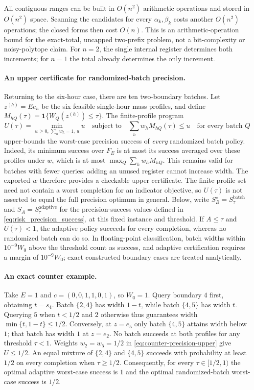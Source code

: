 All contiguous ranges can be built in $O(n^2)$ arithmetic operations
and stored in $O(n^2)$ space. Scanning the candidates for every
$\alpha_k,\beta_k$ costs another $O(n^2)$ operations; the closed forms
then cost $O(n)$. This is an arithmetic-operation bound for the exact-total,
uncapped two-prefix problem, not a bit-complexity or noisy-polytope claim.
For $n=2$, the single internal register determines both increments;
for $n=1$ the total already determines the only increment.


\paragraph{An upper certificate for randomized-batch precision.}
Returning to the six-hour case, there are ten two-boundary batches.
Let $z^{(h)}=Ee_h$ be the six feasible
single-hour mass profiles, and define
$M_{hQ}(\tau)=\mathbf1\{W_Q(z^{(h)})\leq\tau\}$.
The finite-profile program
\begin{equation}
 U(\tau)=\min_{w\geq0,\,\sum_hw_h=1,\,u}u
 \quad\text{subject to}\quad
 \sum_hw_hM_{hQ}(\tau)\leq u\quad\text{for every batch }Q
 \label{eq:counter-precision-upper}
\end{equation}
upper-bounds the worst-case precision success of \emph{every} randomized
batch policy. Indeed, its minimum success over $F_E$ is at most its success
averaged over these profiles under $w$, which is at most
$\max_Q\sum_hw_hM_{hQ}$. This remains valid for batches with fewer queries:
adding an unused register cannot increase width. The exported $w$ therefore
provides a checkable upper certificate. The finite profile set need not
contain a worst completion for an indicator objective, so $U(\tau)$ is not
asserted to equal the full precision optimum in general. Below, write
$S_B^\star=S_\tau^{\mathrm{batch}}$ and
$S_A=S_\tau^{\mathrm{adaptive}}$ for the precision-success values defined
in \eqref{eq:risk_precision_success}, at this fixed instance and threshold.
If $A\leq\tau$ and $U(\tau)<1$, the adaptive policy succeeds for every
completion, whereas no randomized batch can do so. In floating-point
classification, batch widths within $10^{-9}W_0$ above the threshold count
as success, and adaptive certification requires a margin of
$10^{-9}W_0$; exact constructed boundary cases are treated analytically.

\paragraph{An exact counter example.}
Take $E=1$ and $c=(0,0,1,1,0,1)$, so $W_0=1$.
Query boundary $4$ first, obtaining $t=s_4$.
Batch $\{2,4\}$ has width $1-t$, while batch $\{4,5\}$ has width $t$.
Querying $5$ when $t<1/2$ and $2$ otherwise thus guarantees
width $\min\{t,1-t\}\leq1/2$.
Conversely, at $z=e_5$ only batch $\{4,5\}$ attains width below $1$;
that batch has width $1$ at $z=e_2$. No batch succeeds at both profiles
for any threshold $\tau<1$. Weights $w_2=w_5=1/2$ in
\eqref{eq:counter-precision-upper} give $U\leq1/2$.
An equal mixture of $\{2,4\}$ and $\{4,5\}$ succeeds with probability
at least $1/2$ on every completion when $\tau\geq1/2$.
Consequently, for every $\tau\in[1/2,1)$ the optimal adaptive worst-case
success is $1$ and the optimal randomized-batch worst-case success is
$1/2$.
